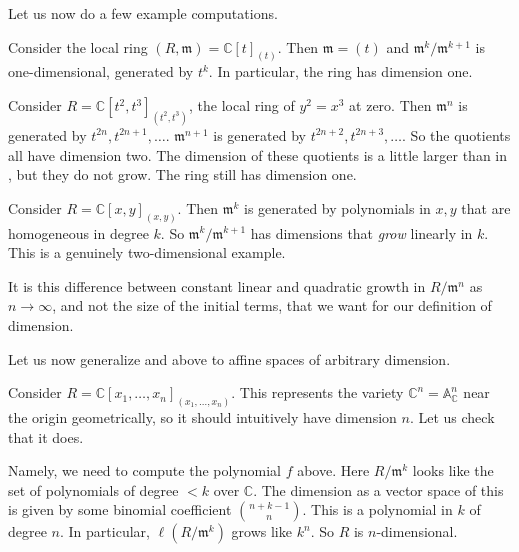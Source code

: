 Let us now do a few example computations. 

\begin{example} \label{easydimcomputation}
\label{dimaffineline}
Consider the local ring $(R, \mathfrak{m}) = \mathbb{C}[t]_{(t)}$. Then $\mathfrak{m} = (t)$ and
$\mathfrak{m}^k/\mathfrak{m}^{k+1}$ is one-dimensional, generated by $t^k$. In
particular, the ring has dimension one. 
\end{example} 

\begin{example} Consider $R = \mathbb{C}[t^2, t^3]_{(t^2, t^3)}$, the local ring of $y^2 = x^3$
at zero. Then $\mathfrak{m}^n$ is generated by $t^{2n}, t^{2n+1}, \dots$.
$\mathfrak{m}^{n+1}$ is generated by $t^{2n+2}, t^{2n+3}, \dots$. So the
quotients all have dimension two. The dimension of these quotients is a little
larger than in , but they do not grow. The ring still has dimension one. 
\end{example} 

\begin{example} \label{dimaffineplane}
Consider $R = \mathbb{C}[x,y]_{(x,y)}$. Then $\mathfrak{m}^k$ is generated by
polynomials in $x,y$ that are homogeneous in degree $k$. So $\mathfrak{m}^k/\mathfrak{m}^{k+1}$
has dimensions that \emph{grow} linearly in $k$. This is a genuinely two-dimensional
example. 
\end{example} 

It is this difference between constant linear and quadratic growth in
$R/\mathfrak{m}^n$ as $n \to \infty$, and not the size of the initial terms,
that we want for our definition of dimension.

Let us now generalize  and 
above to affine spaces of arbitrary dimension. 
\begin{example} 
Consider $R = \mathbb{C}[x_1, \dots, x_n]_{(x_1, \dots, x_n)}$. 
This represents the variety $\mathbb{C}^n = \mathbb{A}^n_{\mathbb{C}}$ near the origin geometrically, so
it should intuitively have dimension $n$. Let us check that it does. 

Namely, we need to compute the polynomial $f$ above. Here $R/\mathfrak{m}^k$ looks like the set of
polynomials of degree $<k$ over $\mathbb{C}$. The dimension as a vector space
of this is
given by some binomial coefficient $\binom{n+k-1}{n}$. This is a polynomial in
$k$ of degree $n$. In particular, $\ell(R/\mathfrak{m}^k)$ grows like $k^n$.
So $R$ is $n$-dimensional. 
\end{example} 



